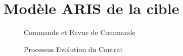 \chapter{Modèle ARIS de la cible}

\begin{figure}[H]
    \label{fig-commande-revue}
    \noindent{}
    \caption{Commande et Revue de Commande}
\end{figure}

\begin{figure}[H]
    \label{fig-evol-contrat}
    \noindent{}
    \caption{Processus Evolution du Contrat}
\end{figure}

